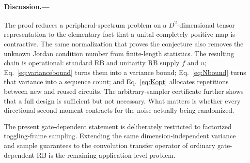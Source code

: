 \documentclass[aps,prl,reprint,superscriptaddress,nofootinbib]{revtex4-2}
\begin{document}
\paragraph{Discussion.---}
The proof reduces a peripheral-spectrum problem on a $D^2$-dimensional tensor
representation to the elementary fact that a unital completely positive map
is contractive.  The same normalization that proves the conjecture also
removes the unknown Jordan condition number from finite-length statistics.
The resulting chain is operational: standard RB and unitarity RB supply
$f$ and $u$; Eq.~\eqref{eq:variancebound} turns them into a variance bound;
Eq.~\eqref{eq:Nbound} turns that variance into a sequence count; and
Eq.~\eqref{eq:Kopt} allocates repetitions between new and reused circuits.
The arbitrary-sampler certificate further shows that a full design is
sufficient but not necessary.  What matters is whether every directional
second moment contracts for the noise actually being randomized.

The present gate-dependent statement is deliberately restricted to
factorized toggling-frame sampling.  Extending the same dimension-independent
variance and sample guarantees to the convolution transfer operator of
ordinary gate-dependent RB is the remaining application-level problem.


\end{document}
